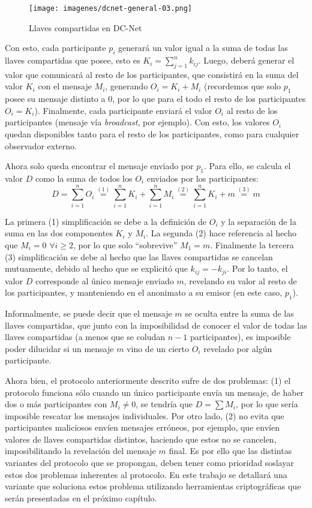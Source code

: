\begin{figure}[H]
  \centering
    \texttt{[image: imagenes/dcnet-general-03.png]}
  \caption{Llaves compartidas en DC-Net}
\end{figure}

Con esto, cada participante $p_i$ generará un valor igual a la suma de todas las llaves compartidas que posee, esto es $K_i = \sum_{j=1}^n k_{ij}$. 
Luego, deberá generar el valor que comunicará al resto de los participantes, que consistirá en la suma del valor $K_i$ con el mensaje $M_i$, 
generando $O_i = K_i + M_i$ (recordemos que solo $p_1$ posee su mensaje distinto a 0, por lo que para el todo el resto de los participantes $O_i = K_i$). 
Finalmente, cada participante enviará el valor $O_i$ al resto de los participantes (mensaje vía \emph{broadcast}, por ejemplo). Con esto, los 
valores $O_i$ quedan disponibles tanto para el resto de los participantes, como para cualquier observador externo.

Ahora solo queda encontrar el mensaje enviado por $p_1$. Para ello, se calcula el valor $D$ como la suma de todos los $O_i$ enviados por los 
participantes: $$D = \sum_{i=1}^n O_i \overset{(1)}{=} \sum_{i=1}^n K_i + \sum_{i=1}^n M_i \overset{(2)}{=} \sum_{i=1}^n K_i + m \overset{(3)}{=} m$$

La primera (1) simplificación se debe a la definición de $O_i$ y la separación de la suma en las dos componentes $K_i$ y $M_i$. La segunda 
(2) hace referencia al hecho que $M_i = 0$ $\forall i \geq 2$, por lo que solo ``sobrevive'' $M_1 = m$. Finalmente la tercera (3) simplificación 
se debe al hecho que las llaves compartidas se cancelan mutuamente, debido al hecho que se explicitó que $k_{ij} = -k_{ji}$. Por lo tanto, el 
valor $D$ corresponde al único mensaje enviado $m$, revelando su valor al resto de los participantes, y manteniendo en el anonimato a su emisor 
(en este caso, $p_1$).

Informalmente, se puede decir que el mensaje $m$ se oculta entre la suma de las llaves compartidas, que junto con la imposibilidad de conocer el 
valor de todas las llaves compartidas (a menos que se coludan $n-1$ participantes), es imposible poder dilucidar si un mensaje $m$ vino de un 
cierto $O_i$ revelado por algún participante.

Ahora bien, el protocolo anteriormente descrito sufre de dos problemas: (1) el protocolo funciona sólo cuando un 
único participante envía un mensaje, de haber dos o más participantes con $M_i \neq 0$, se tendría que $D = \sum M_i$, por lo que sería imposible 
rescatar los mensajes individuales. Por otro lado, (2) no evita que participantes maliciosos envíen mensajes erróneos, por ejemplo, que envíen 
valores de llaves compartidas distintos, haciendo que estos no se cancelen, imposibilitando la revelación del mensaje $m$ final. Es por ello que 
las distintas variantes del protocolo que se propongan, deben tener como prioridad soslayar estos dos problemas inherentes al protocolo. En este 
trabajo se detallará una variante que soluciona estos problema utilizando herramientas criptográficas que serán presentadas en el próximo capítulo.

